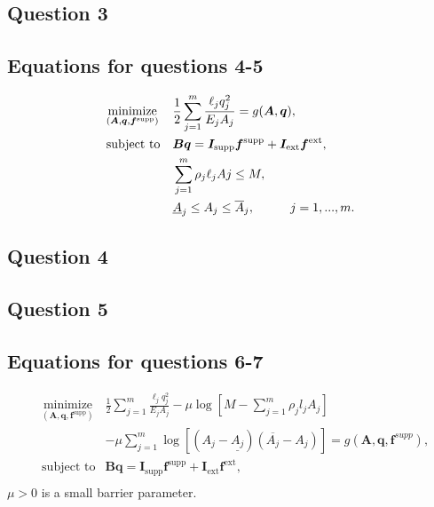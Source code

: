\documentclass[10pt,a4paper]{article}
\begin{document}
\subsection*{Question 3}



\subsection*{Equations for questions 4-5}

\begin{equation}
 \begin{aligned}
 \label{eq:system6}
 & \underset{(\bm{A},\bm{q},\bm{f}^{\textrm{supp}})}{\text{minimize}}
 & & \frac{1}{2}\sum_{j=1}^{m}\frac{\ell_{j}q_{j}^{2}}{E_{j}A_{j}} = g(\bm{A}, \bm{q}), \\
 & \text{subject to}
 & & \bm{Bq} = \bm{I}_{\textrm{supp}}\bm{f}^{\textrm{supp}} + \bm{I}_{\textrm{ext}}\bm{f}^{\textrm{ext}},\\
 & & & \sum_{j=1}^{m}{\rho_{j}\ell_{j}A{j}} \leq M,\\
 & & & \underline{A}_{j} \leq A_{j} \leq \overline{A}_{j}, \hspace{10 mm}  j = 1,...,m.
 \end{aligned}
\end{equation}



\subsection*{Question 4}



\subsection*{Question 5}


\subsection*{Equations for questions 6-7}

\begin{equation}
 \begin{aligned}
 \label{eq:system7}
 & \underset{(\bm{A},\bm{q},\bm{f}^{\textrm{supp}})}{\text{minimize}} & \frac{1}{2}\sum_{j=1}^{m}\frac{\ell_{j}q_{j}^{2}}{E_{j}A_{j}} -\mu \log[M - \sum\limits_{j=1}^m\rho_{j}l_{j}A_{j}] \\
 & &-\mu\sum\limits_{j=1}^m\log[(A_{j}-\underline{A_{j}})(\overline{A_{j}} - A_{j})] = g(\bm{A}, \bm{q},\bm{f}^{supp}), \\
 & \text{subject to}
 & \bm{Bq} = \bm{I}_{\textrm{supp}}\bm{f}^{\textrm{supp}} + \bm{I}_{\textrm{ext}}\bm{f}^{\textrm{ext}},\\
 \end{aligned}
\end{equation}
$\mu > 0$ is a small barrier parameter.
\end{document}
